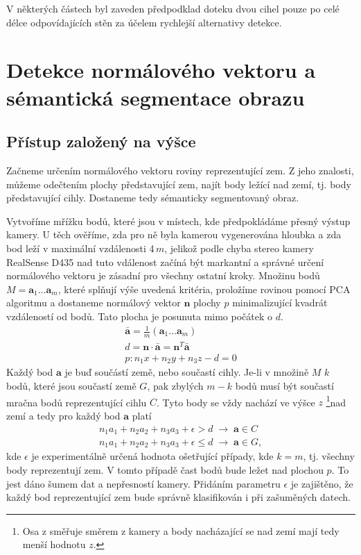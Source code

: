 \documentclass[twoside]{ctuthesis}
\newcommand{\tl}[1]{$\mathbf{#1}$}
\begin{document}
V některých částech byl zaveden předpodklad doteku dvou cihel pouze po celé délce odpovídajících stěn za účelem rychlejší alternativy detekce.
\section{Detekce normálového vektoru a sémantická segmentace obrazu}
\label{sec:normal_est}
\subsection{Přístup založený na výšce}
\label{subsec:height}
Začneme určením normálového vektoru roviny reprezentující zem. Z jeho znalosti, můžeme odečtením plochy představující zem, najít body ležící nad zemí, tj. body představující cihly. Dostaneme tedy sémanticky segmentovaný obraz.

Vytvoříme mřížku bodů, které jsou v místech, kde předpokládáme přesný výstup kamery. U těch ověříme, zda pro ně byla kamerou vygenerována hloubka a zda bod leží v maximální vzdálenosti 4\,$m$, jelikož podle \cite{keselman2017intel}  chyba stereo kamery RealSense D435 nad tuto vdálenost začíná být markantní a správné určení normálového vektoru je zásadní pro všechny ostatní kroky. Množinu bodů $M = \mathbf{a}_1 \dotsc \mathbf{a}_m$, které splňují výše uvedená kritéria, proložíme rovinou pomocí PCA algoritmu a dostaneme normálový vektor \tl{n} plochy $p$ minimalizující kvadrát vzdáleností od bodů. Tato plocha je posunuta mimo počátek o $d$.
\begin{align}
    \mathbf{\bar{a}} = \frac{1}{m}\left( \mathbf{a}_1 \dotsc \mathbf{a}_m \right) \\
    d = \mathbf{n} \cdot \mathbf{\bar{a}} = \mathbf{n}^T \mathbf{\bar{a}} \\
    p: n_1x + n_2y + n_3z - d = 0 \label{normal_plane}
\end{align}
Každý bod \tl{a} je buď součástí země, nebo součastí cihly. Je-li v množině $M$ $k$ bodů, které jsou součastí země $G$, pak zbylých $m - k$ bodů musí být součastí mračna bodů reprezentující cihlu $C$. Tyto body se vždy nachází ve výšce $z$ \footnote{Osa z směřuje směrem z kamery a body nacházající se nad zemí mají tedy menší hodnotu $z$.}nad zemí a tedy pro každý bod \tl{a} platí
\begin{align}
    n_1a_1 + n_2a_2 + n_3a_3 + \epsilon > d \; \rightarrow \; \mathbf{a} \in C  \\
    n_1a_1 + n_2a_2 + n_3a_3 + \epsilon \leq d \; \rightarrow \; \mathbf{a} \in G,
\end{align}
kde $\epsilon$ je experimentálně určená hodnota ošetřující případy, kde $k = m$, tj. všechny body reprezentují zem. V tomto případě čast bodů bude ležet nad plochou $p$. To jest dáno šumem dat a nepřesností kamery. Přidáním parametru $\epsilon$ je zajištěno, že každý bod reprezentující zem bude správně klasifikován i při zašuměných datech.
\end{document}
